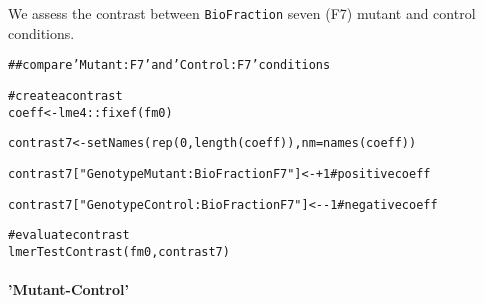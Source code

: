 \documentclass[11pt]{elife}\usepackage[]{graphicx}\usepackage[]{color}
\makeatletter
\newcommand{\hlnum}[1]{\textcolor[rgb]{0.063,0.58,0.627}{#1}}%
\newcommand{\hlstr}[1]{\textcolor[rgb]{0.063,0.58,0.627}{#1}}%
\newcommand{\hlcom}[1]{\textcolor[rgb]{0.588,0.588,0.588}{#1}}%
\newcommand{\hlopt}[1]{\textcolor[rgb]{0.196,0.196,0.196}{#1}}%
\newcommand{\hlstd}[1]{\textcolor[rgb]{0.196,0.196,0.196}{#1}}%
\newcommand{\hlkwb}[1]{\textcolor[rgb]{0.627,0,0.314}{#1}}%
\newcommand{\hlkwc}[1]{\textcolor[rgb]{0,0.631,0.314}{#1}}%
\newcommand{\hlkwd}[1]{\textcolor[rgb]{0.78,0.227,0.412}{#1}}%
\newenvironment{kframe}{%
 \def\at@end@of@kframe{}%
 \ifinner\ifhmode%
  \def\at@end@of@kframe{\end{minipage}}%
  \begin{minipage}{\columnwidth}%
 \fi\fi%
 \def\FrameCommand##1{\hskip\@totalleftmargin \hskip-\fboxsep
 \colorbox{shadecolor}{##1}\hskip-\fboxsep
     \hskip-\linewidth \hskip-\@totalleftmargin \hskip\columnwidth}%
 \MakeFramed {\advance\hsize-\width
   \@totalleftmargin\z@ \linewidth\hsize
   \@setminipage}}%
 {\par\unskip\endMakeFramed%
 \at@end@of@kframe}
\newenvironment{knitrout}{}{} %
\makeatother
\begin{document}
We assess the contrast between \texttt{BioFraction} seven (F7) mutant and
control conditions.
\begin{knitrout}
\color{fgcolor}\begin{kframe}
\begin{alltt}
\hlcom{## compare 'Mutant:F7' and 'Control:F7' conditions}

\hlcom{# create a contrast}
\hlstd{coeff} \hlkwb{<-} \hlstd{lme4}\hlopt{::}\hlkwd{fixef}\hlstd{(fm0)}
\end{alltt}


{\ttfamily\noindent\bfseries\color{errorcolor}{\#\# Error in lme4::fixef(fm0): object 'fm0' not found}}\begin{alltt}
\hlstd{contrast7} \hlkwb{<-} \hlkwd{setNames}\hlstd{(}\hlkwd{rep}\hlstd{(}\hlnum{0}\hlstd{,}\hlkwd{length}\hlstd{(coeff)),} \hlkwc{nm} \hlstd{=} \hlkwd{names}\hlstd{(coeff))}
\end{alltt}


{\ttfamily\noindent\bfseries\color{errorcolor}{\#\# Error in setNames(rep(0, length(coeff)), nm = names(coeff)): object 'coeff' not found}}\begin{alltt}
\hlstd{contrast7[}\hlstr{"GenotypeMutant:BioFractionF7"}\hlstd{]} \hlkwb{<-} \hlopt{+}\hlnum{1} \hlcom{# positive coeff}
\end{alltt}


{\ttfamily\noindent\bfseries{}}\begin{alltt}
\hlstd{contrast7[}\hlstr{"GenotypeControl:BioFractionF7"}\hlstd{]} \hlkwb{<-} \hlopt{-}\hlnum{1} \hlcom{# negative coeff}
\end{alltt}


{\ttfamily\noindent\bfseries{}}\begin{alltt}
\hlcom{# evaluate contrast}
\hlkwd{lmerTestContrast}\hlstd{(fm0, contrast7)}
\end{alltt}


{\ttfamily\noindent\bfseries\color{errorcolor}{\#\# Error in stopifnot(all(names(contrast) == names(lme4::fixef(fm)))): object 'contrast7' not found}}\end{kframe}
\end{knitrout}

\paragraph{'Mutant-Control'}
\end{document}

